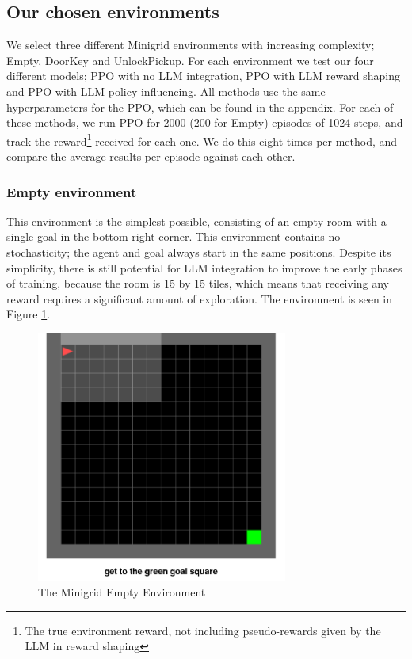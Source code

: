 \documentclass[conference]{IEEEtran}
\begin{document}
\subsection{Our chosen environments}

We select three different Minigrid environments with increasing complexity; Empty, DoorKey and UnlockPickup. For each environment we test our four different models; PPO with no LLM integration, PPO with LLM reward shaping and PPO with LLM policy influencing. All methods use the same hyperparameters for the PPO, which can be found in the appendix. For each of these methods, we run PPO for 2000 (200 for Empty) episodes of 1024 steps, and track the reward\footnote{The true environment reward, not including pseudo-rewards given by the LLM in reward shaping} received for each one. We do this eight times per method, and compare the average results per episode against each other.

\subsubsection{Empty environment}

This environment is the simplest possible, consisting of an empty room with a single goal in the bottom right corner. This environment contains no stochasticity; the agent and goal always start in the same positions. Despite its simplicity, there is still potential for LLM integration to improve the early phases of training, because the room is 15 by 15 tiles, which means that receiving any reward requires a significant amount of exploration. The environment is seen in Figure \ref{emptyenv}.

\begin{figure}[h]
\centerline{\includegraphics[width=3.25in]{figure/emptyenv.png}}
\caption{The Minigrid Empty Environment}
\label{emptyenv}
\end{figure}
\end{document}
